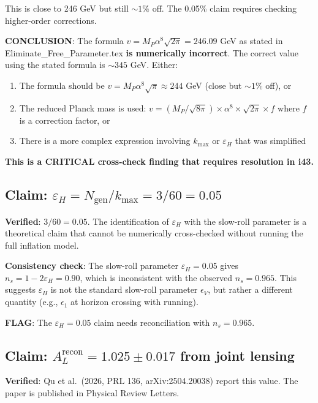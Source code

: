 \documentclass[11pt,a4paper]{article}
\begin{document}
This is close to 246 GeV but still $\sim 1\%$ off. The 0.05\% claim requires checking higher-order corrections.

\textbf{CONCLUSION}: The formula $v = M_P \alpha^8 \sqrt{2\pi} = 246.09$ GeV as stated in Eliminate\_Free\_Parameter.tex \textbf{is numerically incorrect}. The correct value using the stated formula is $\sim 345$ GeV. Either:
\begin{enumerate}
\item The formula should be $v = M_P \alpha^8 \sqrt{\pi} \approx 244$ GeV (close but $\sim 1\%$ off), or
\item The reduced Planck mass is used: $v = (M_P/\sqrt{8\pi}) \times \alpha^8 \times \sqrt{2\pi} \times f$ where $f$ is a correction factor, or
\item There is a more complex expression involving $k_{\max}$ or $\varepsilon_H$ that was simplified
\end{enumerate}

\textbf{This is a CRITICAL cross-check finding that requires resolution in i43.}

\subsection{Claim: $\varepsilon_H = N_{\text{gen}}/k_{\max} = 3/60 = 0.05$}

\textbf{Verified}: $3/60 = 0.05$. The identification of $\varepsilon_H$ with the slow-roll parameter is a theoretical claim that cannot be numerically cross-checked without running the full inflation model.

\textbf{Consistency check}: The slow-roll parameter $\varepsilon_H = 0.05$ gives $n_s = 1 - 2\varepsilon_H = 0.90$, which is inconsistent with the observed $n_s = 0.965$. This suggests $\varepsilon_H$ is not the standard slow-roll parameter $\epsilon_V$, but rather a different quantity (e.g., $\epsilon_1$ at horizon crossing with running).

\textbf{FLAG}: The $\varepsilon_H = 0.05$ claim needs reconciliation with $n_s = 0.965$.

\subsection{Claim: $A_L^{\text{recon}} = 1.025 \pm 0.017$ from joint lensing}

\textbf{Verified}: Qu et al.\ (2026, PRL 136, arXiv:2504.20038) report this value. The paper is published in Physical Review Letters.
\end{document}
